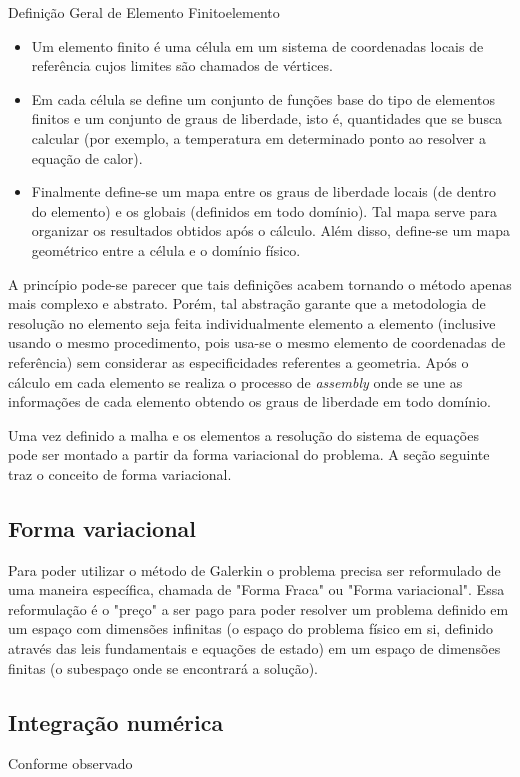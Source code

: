     \begin{Definition}{Definição Geral de Elemento Finito}{elemento}
      \begin{itemize}
        \item Um elemento finito é uma célula em um sistema de coordenadas
      locais de referência cujos limites são chamados de vértices.

        \item Em cada célula se define um conjunto de funções base do tipo de elementos
      finitos e um conjunto de graus de liberdade, isto é, quantidades que se
      busca calcular (por exemplo, a temperatura em determinado ponto ao resolver
      a equação de calor).
     
        \item Finalmente define-se um mapa entre os graus de liberdade locais (de dentro
      do elemento) e os globais (definidos em todo domínio). Tal mapa serve para
      organizar os resultados obtidos após o cálculo. Além disso, define-se um
      mapa geométrico entre a célula e o domínio físico.
      \end{itemize}
      \end{Definition}

    A princípio pode-se parecer que tais definições acabem tornando o método apenas mais complexo e abstrato. Porém, tal abstração garante que a  metodologia de resolução no elemento seja feita individualmente elemento a elemento (inclusive usando o mesmo procedimento, pois usa-se o mesmo elemento de coordenadas de referência) sem considerar as especificidades referentes a geometria. Após o cálculo em cada elemento se realiza o processo de \textit{assembly} onde se une as informações de cada elemento obtendo os graus de liberdade em todo domínio.
    
    Uma vez definido a malha e os elementos a resolução do sistema de equações  pode ser montado a partir da forma variacional do problema. A seção seguinte traz o conceito de forma variacional.

    \subsection{Forma variacional}
    Para poder utilizar o método de Galerkin o problema precisa ser reformulado de uma maneira específica, chamada de "Forma Fraca" ou "Forma variacional". Essa reformulação é o "preço" a ser pago para poder resolver um problema definido em um espaço com dimensões infinitas (o espaço do problema físico em si, definido através das leis fundamentais e equações de estado) em um espaço de dimensões finitas (o subespaço onde se encontrará a solução).
    
    \subsection{Integração numérica}
    Conforme observado 
